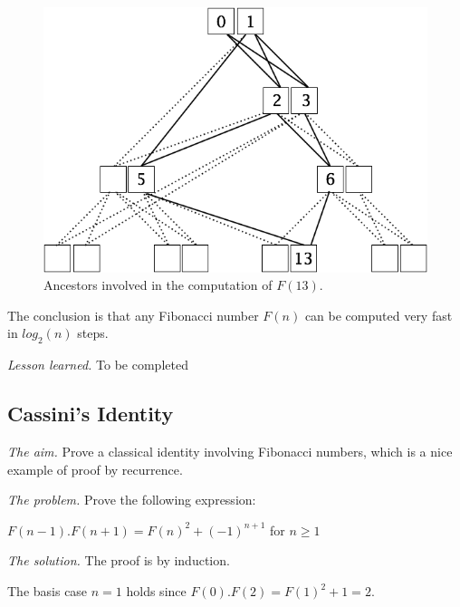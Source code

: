 \begin{figure}[h]
\begin{center}
        \includegraphics[scale=0.4]{FiguresMaths/FiboFast13.png}
        \caption{Ancestors involved in the computation of $F(13)$. }
        \label{fig:fastFibo13}
\end{center}
\end{figure}

The conclusion is that
any Fibonacci number $F(n)$ can be computed very fast in $log_2 (n)$ steps.
\medskip

\noindent \textit{Lesson learned.}
To be completed


\subsection{Cassini's Identity}

\noindent \textit{The aim.}
Prove a classical identity involving Fibonacci numbers, which is a nice example of proof by recurrence.
\medskip

\noindent \textit{The problem.}
Prove the following expression:

$F(n-1).F(n+1) = F(n)^2 + (-1)^{n+1}$ for $n \geq 1$
\medskip

%
%
%
%
%

\noindent \textit{The solution.}
The proof is by induction.

The basis case $n=1$ holds since $F(0).F(2) = F(1)^2 +1 = 2$.

